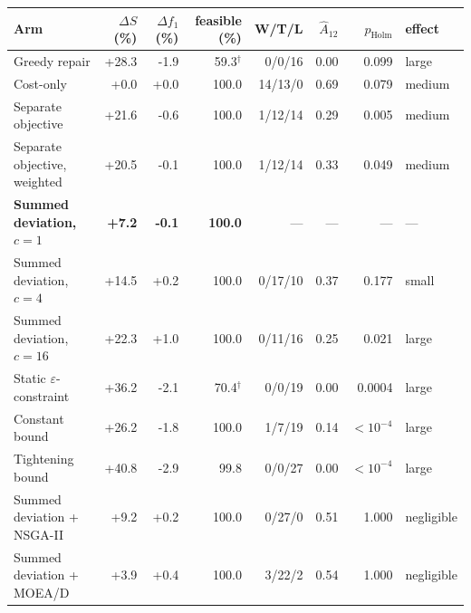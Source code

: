 \begin{tabular}{lrrrrrrl}
\toprule
\textbf{Arm} & $\Delta S$ (\%) & $\Delta f_1$ (\%) & feasible (\%) & W/T/L & $\hat{A}_{12}$ & $p_{\text{Holm}}$ & effect \\
\midrule
Greedy repair & +28.3 & -1.9 & 59.3$^{\dagger}$ & 0/0/16 & 0.00 & 0.099 & large \\
Cost-only & +0.0 & +0.0 & 100.0 & 14/13/0 & 0.69 & 0.079 & medium \\
Separate objective & +21.6 & -0.6 & 100.0 & 1/12/14 & 0.29 & 0.005 & medium \\
Separate objective, weighted & +20.5 & -0.1 & 100.0 & 1/12/14 & 0.33 & 0.049 & medium \\
\textbf{Summed deviation, $c=1$} & \textbf{+7.2} & \textbf{-0.1} & \textbf{100.0} & --- & --- & --- & --- \\
Summed deviation, $c=4$ & +14.5 & +0.2 & 100.0 & 0/17/10 & 0.37 & 0.177 & small \\
Summed deviation, $c=16$ & +22.3 & +1.0 & 100.0 & 0/11/16 & 0.25 & 0.021 & large \\
Static $\varepsilon$-constraint & +36.2 & -2.1 & 70.4$^{\dagger}$ & 0/0/19 & 0.00 & 0.0004 & large \\
Constant bound & +26.2 & -1.8 & 100.0 & 1/7/19 & 0.14 & $<10^{-4}$ & large \\
Tightening bound & +40.8 & -2.9 & 99.8 & 0/0/27 & 0.00 & $<10^{-4}$ & large \\
Summed deviation + NSGA-II & +9.2 & +0.2 & 100.0 & 0/27/0 & 0.51 & 1.000 & negligible \\
Summed deviation + MOEA/D & +3.9 & +0.4 & 100.0 & 3/22/2 & 0.54 & 1.000 & negligible \\
\bottomrule
\end{tabular}
